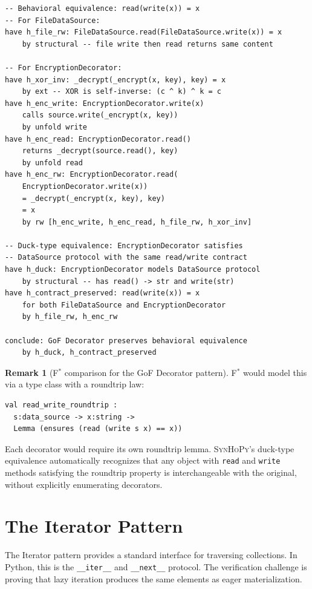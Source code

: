\documentclass[11pt,a4paper]{report}
\theoremstyle{definition}
\newtheorem{remark}[definition]{Remark}
\theoremstyle{plain}
\newcommand{\fstar}{F$^{*}$}
\newcommand{\synhopy}{\textsc{SynHoPy}}
\begin{document}
\begin{lstlisting}[style=proof]
-- Behavioral equivalence: read(write(x)) = x
-- For FileDataSource:
have h_file_rw: FileDataSource.read(FileDataSource.write(x)) = x
    by structural -- file write then read returns same content

-- For EncryptionDecorator:
have h_xor_inv: _decrypt(_encrypt(x, key), key) = x
    by ext -- XOR is self-inverse: (c ^ k) ^ k = c
have h_enc_write: EncryptionDecorator.write(x)
    calls source.write(_encrypt(x, key))
    by unfold write
have h_enc_read: EncryptionDecorator.read()
    returns _decrypt(source.read(), key)
    by unfold read
have h_enc_rw: EncryptionDecorator.read(
    EncryptionDecorator.write(x))
    = _decrypt(_encrypt(x, key), key)
    = x
    by rw [h_enc_write, h_enc_read, h_file_rw, h_xor_inv]

-- Duck-type equivalence: EncryptionDecorator satisfies
-- DataSource protocol with the same read/write contract
have h_duck: EncryptionDecorator models DataSource protocol
    by structural -- has read() -> str and write(str)
have h_contract_preserved: read(write(x)) = x
    for both FileDataSource and EncryptionDecorator
    by h_file_rw, h_enc_rw

conclude: GoF Decorator preserves behavioral equivalence
    by h_duck, h_contract_preserved
\end{lstlisting}

\begin{remark}[\fstar{} comparison for the GoF Decorator pattern]
\fstar{} would model this via a type class with a roundtrip law:
\begin{lstlisting}[style=fstar]
val read_write_roundtrip :
  s:data_source -> x:string ->
  Lemma (ensures (read (write s x) == x))
\end{lstlisting}
Each decorator would require its own roundtrip lemma.  \synhopy{}'s
duck-type equivalence automatically recognizes that any object with
\lstinline[style=python]{read} and \lstinline[style=python]{write}
methods satisfying the roundtrip property is interchangeable with the
original, without explicitly enumerating decorators.
\end{remark}

\section{The Iterator Pattern}

The Iterator pattern provides a standard interface for traversing
collections.  In Python, this is the \lstinline[style=python]{__iter__}
and \lstinline[style=python]{__next__} protocol.  The verification
challenge is proving that lazy iteration produces the same elements
as eager materialization.
\end{document}
